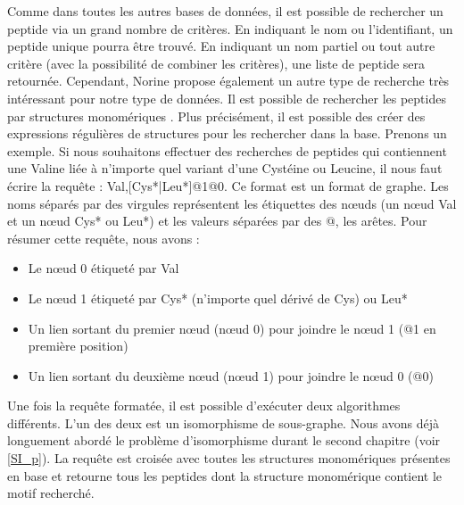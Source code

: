 Comme dans toutes les autres bases de données, il est possible de rechercher un peptide via un grand nombre de critères.
En indiquant le nom ou l'identifiant, un peptide unique pourra être trouvé.
En indiquant un nom partiel ou tout autre critère (avec la possibilité de combiner les critères), une liste de peptide sera retournée.
Cependant, Norine propose également un autre type de recherche très intéressant pour notre type de données.
Il est possible de rechercher les peptides par structures monomériques \cite{caboche_structural_2009}.
Plus précisément, il est possible des créer des expressions régulières de structures pour les rechercher dans la base.
Prenons un exemple.
Si nous souhaitons effectuer des recherches de peptides qui contiennent une Valine liée à n'importe quel variant d'une Cystéine ou Leucine, il nous faut écrire la requête : Val,[Cys*|Leu*]@1@0.
Ce format est un format de graphe.
Les noms séparés par des virgules représentent les étiquettes des n\oe{}uds (un n\oe{}ud Val et un n\oe{}ud Cys* ou Leu*) et les valeurs séparées par des @, les arêtes.
Pour résumer cette requête, nous avons :
\begin{itemize}
 \item Le n\oe{}ud 0 étiqueté par Val
 \item Le n\oe{}ud 1 étiqueté par Cys* (n'importe quel dérivé de Cys) ou Leu*
 \item Un lien sortant du premier n\oe{}ud (n\oe{}ud 0) pour joindre le n\oe{}ud 1 (@1 en première position)
 \item Un lien sortant du deuxième n\oe{}ud (n\oe{}ud 1) pour joindre le n\oe{}ud 0 (@0)
\end{itemize}

Une fois la requête formatée, il est possible d'exécuter deux algorithmes différents.
L'un des deux est un isomorphisme de sous-graphe.
Nous avons déjà longuement abordé le problème d'isomorphisme durant le second chapitre (voir \ref{SI_p}).
La requête est croisée avec toutes les structures monomériques présentes en base et retourne tous les peptides dont la structure monomérique contient le motif recherché.

